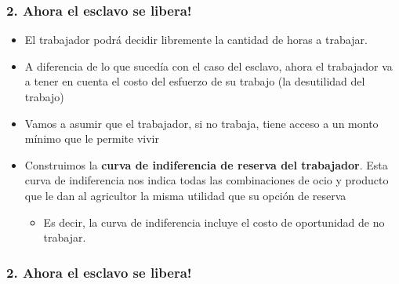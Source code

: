 \documentclass{beamer}
\begin{document}
\begin{frame}
\frametitle{2. Ahora el esclavo se libera!}
        \begin{itemize}
            \item El trabajador podrá decidir libremente la cantidad de horas a trabajar.
            \item A diferencia de lo que sucedía con el caso del esclavo, ahora el trabajador va a tener en cuenta el costo del esfuerzo de su trabajo (la desutilidad del trabajo)  \vspace{1mm}
            \item Vamos a asumir que el trabajador, si no trabaja, tiene acceso a un monto mínimo que le permite vivir \vspace{1mm}
            \item Construimos la \textbf{curva de indiferencia de reserva del trabajador}. Esta curva de indiferencia nos indica todas las combinaciones de ocio y producto que le dan al agricultor la misma utilidad que su opción de reserva
            \begin{itemize}
                \item  Es decir, la curva de indiferencia incluye el costo de oportunidad de no trabajar.
            \end{itemize}
    \end{itemize}
\end{frame}

\begin{frame}
\frametitle{2. Ahora el esclavo se libera!}
\begin{center}
\begin{figure}[H]
\renewcommand{\figurename}{Figure}
\begin{center}
\end{center}
\end{figure}
\end{center}
\end{frame}
\end{document}
